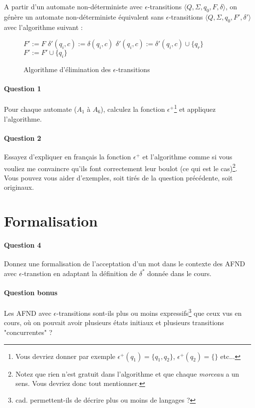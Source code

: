\documentclass{article}[11pt]
\theoremstyle{definition}
\begin{document}
 
A partir d'un automate non-déterministe avec $\epsilon$-transitions  $\big \langle Q,\Sigma,q_0,F,\delta \big \rangle$, on génère un automate non-déterministe équivalent sans $\epsilon$-transitions  $\big \langle Q,\Sigma,q_0,F',\delta' \big \rangle$ avec l'algorithme suivant :

\begin{figure}[!h]
\begin{algorithmic}[1]
\State $F' := F$
        $\delta'(q_i,c) := \delta(q_i,c)$
    \EndFor
\EndFor
{}
			\State $\delta'(q_i,c) := \delta'(q_i,c) \cup \{q_r\}$
		\EndFor
			\State $F' := F' \cup \{q_i\}$
		\EndIf
	\EndFor
\EndFor
\end{algorithmic}
\caption{Algorithme d'élimination des $\epsilon$-transitions}
\label{algo}
\end{figure}
\vspace{2cm}
\paragraph*{Question 1} Pour chaque automate ($A_1$ à $A_6$), calculez la fonction $\epsilon^+$\footnote{Vous devriez donner par exemple $\epsilon^+(q_1) = \{q_1,q_2\}$, $\epsilon^+(q_2) = \{\}$ etc...} et appliquez l'algorithme.

\paragraph*{Question 2} Essayez d'expliquer en français la fonction $\epsilon^+$ et l'algorithme comme si vous vouliez me convaincre qu'ils font correctement leur boulot (ce qui est le cas)\footnote{Notez que rien n'est gratuit dans l'algorithme et que chaque \textit{morceau} a un sens. Vous devriez donc tout mentionner.}. Vous pouvez vous aider d'exemples, soit tirés de la question précédente, soit originaux.

\section{Formalisation}

\paragraph*{Question 4} Donnez une formalisation de l'acceptation d'un mot dans le contexte des AFND avec $\epsilon$-transtion en adaptant la définition de $\delta^*$ donnée dans le cours.

\paragraph*{Question bonus} Les AFND avec $\epsilon$-transitions sont-ils plus ou moins expressifs\footnote{cad. permettent-ils de décrire plus ou moins de langages ?} que ceux vus en cours, où on pouvait avoir plusieurs états initiaux et plusieurs transitions "concurrentes" ?


\end{document}
